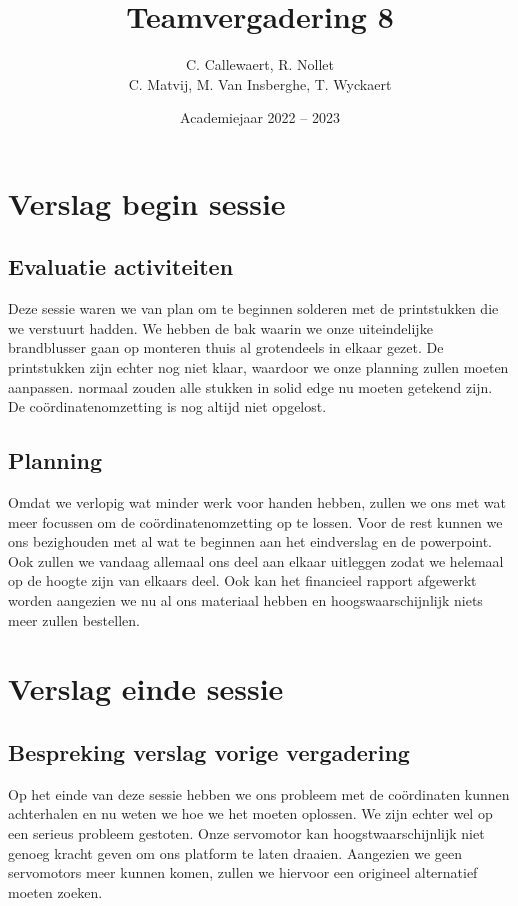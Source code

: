 \documentclass{kulakarticle}
\title{Teamvergadering 8}
\author{C. Callewaert, R. Nollet \\
	C. Matvij, M. Van Insberghe, T. Wyckaert }
\date{Academiejaar 2022 -- 2023}
\begin{document}
	\maketitle
	\section{Verslag begin sessie}
	
	
	
	\subsection{Evaluatie activiteiten}
	
 Deze sessie waren we van plan om te beginnen solderen met de printstukken die we verstuurt hadden. We hebben de bak waarin we onze uiteindelijke brandblusser gaan op monteren thuis al grotendeels in elkaar gezet. De printstukken zijn echter nog niet klaar, waardoor we onze planning zullen moeten aanpassen. normaal zouden alle stukken in solid edge nu moeten getekend zijn. De coördinatenomzetting is nog altijd niet opgelost.
	
	\subsection{Planning}
	
	Omdat we verlopig wat minder werk voor handen hebben, zullen we ons met wat meer focussen om de coördinatenomzetting op te lossen. Voor de rest kunnen we ons bezighouden met al wat te beginnen aan het eindverslag en de powerpoint. Ook zullen we vandaag allemaal ons deel aan elkaar uitleggen zodat we helemaal op de hoogte zijn van elkaars deel. Ook kan het financieel rapport afgewerkt worden aangezien we nu al ons materiaal hebben en hoogswaarschijnlijk niets meer zullen bestellen.
	
	\section{Verslag einde sessie}
	

	
	
	\subsection{Bespreking verslag vorige vergadering}
	
		Op het einde van deze sessie hebben we ons probleem met de coördinaten kunnen achterhalen en nu weten we hoe we het moeten oplossen. We zijn echter wel op een serieus probleem gestoten. Onze servomotor kan hoogstwaarschijnlijk niet genoeg kracht geven om ons platform te laten draaien. Aangezien we geen servomotors meer kunnen komen, zullen we hiervoor een origineel alternatief moeten zoeken.
	
\end{document}
